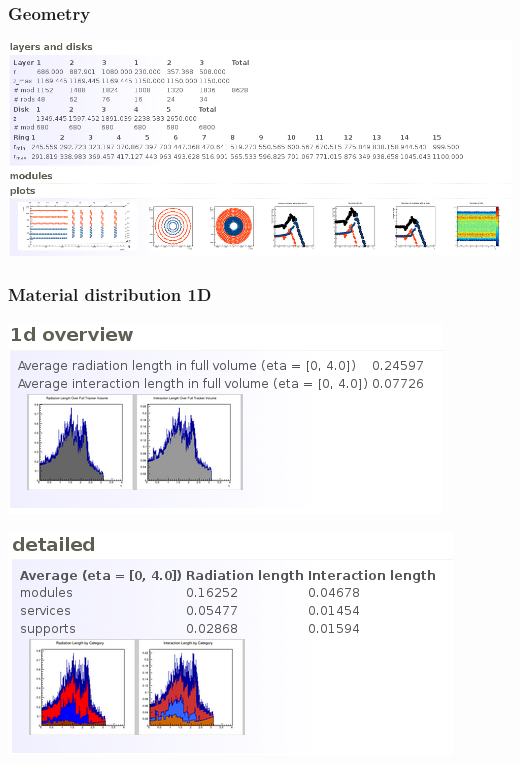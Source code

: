 \documentclass[pdftex, 11pt]{beamer}
\begin{document}
\begin{frame}
\frametitle{Geometry}
  \begin{center}
    \includegraphics[width=\textwidth]{img/screenshot1.png}
  \end{center}
\end{frame}

\begin{frame}
\frametitle{Material distribution 1D}
  \begin{center}
    \includegraphics[width=\textwidth-4cm]{img/screenshot3.png}
  \end{center}
  \begin{center}
    \includegraphics[width=\textwidth-4cm]{img/screenshot4.png}
  \end{center}
\end{frame}
\end{document}
